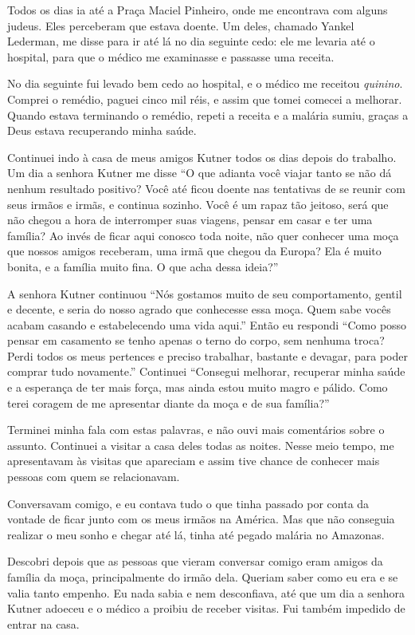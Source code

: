 Todos os dias ia até a Praça Maciel Pinheiro, onde me encontrava com
alguns judeus. Eles perceberam que estava doente. Um deles,
chamado Yankel Lederman, me disse para ir até lá no dia seguinte cedo: 
ele me levaria até o hospital, para que o médico me examinasse e passasse uma receita.

No dia seguinte fui levado bem cedo ao hospital, e o médico me
receitou \textit{quinino}. Comprei o remédio, paguei cinco mil réis, e assim que
tomei comecei a melhorar. Quando estava terminando o remédio,
repeti a receita e a malária sumiu, graças a Deus estava recuperando 
minha saúde.

Continuei indo à casa de meus amigos Kutner todos os dias depois do
trabalho. Um dia a senhora Kutner me disse ``O que adianta você viajar
tanto se não dá nenhum resultado positivo? Você até ficou doente
nas tentativas de se reunir com seus irmãos e irmãs, e continua
sozinho. Você é um rapaz tão jeitoso, será que não chegou a hora de interromper 
suas viagens, pensar em casar e ter uma família? Ao invés de ficar
aqui conosco toda noite, não quer conhecer uma moça que nossos amigos
receberam, uma irmã que chegou da Europa? Ela é muito bonita, e a família
muito fina. O que acha dessa ideia?''

A senhora Kutner continuou ``Nós gostamos muito de seu comportamento,
gentil e decente, e seria do nosso agrado que conhecesse essa moça.
Quem sabe vocês acabam casando e estabelecendo uma vida aqui.'' Então
eu respondi ``Como posso pensar em casamento se tenho apenas o
terno do corpo, sem nenhuma troca? Perdi todos os
meus pertences e preciso trabalhar, bastante e devagar, para poder comprar tudo novamente.'' Continuei ``Consegui melhorar, recuperar minha saúde e a esperança de ter mais força, mas ainda estou muito magro e
pálido. Como terei coragem de me apresentar diante da moça e de sua
família?''

Terminei minha fala com estas palavras, e não ouvi mais comentários sobre o assunto. 
Continuei a visitar a casa deles todas as
noites. Nesse meio tempo, me apresentavam às visitas que apareciam e assim
tive chance de conhecer mais pessoas com quem se relacionavam.

Conversavam comigo, e eu contava tudo o que tinha passado por conta da
vontade de ficar junto com os meus irmãos na América. Mas que não 
conseguia realizar o meu sonho e chegar até lá, tinha até 
pegado malária no Amazonas.

Descobri depois que as pessoas que vieram conversar comigo eram
amigos da família da moça, principalmente do irmão dela. Queriam saber
como eu era e se valia tanto empenho. Eu nada sabia e nem
desconfiava, até que um dia a senhora Kutner adoeceu e o médico a proibiu
de receber visitas. Fui também impedido de entrar na casa.

